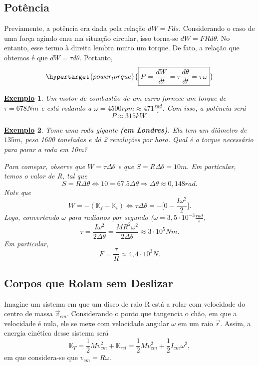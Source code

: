 \documentclass{article}
\newtheorem{example}{\underline{Exemplo}}
\begin{document}
\subsection{Potência}
Previamente, a potência era dada pela relação \(dW = F ds.\) Considerando o caso de uma força agindo
emu ma situação circular, isso torna-se \(dW = FRd\theta \). No entanto, esse termo à direita lembra muito um torque. De fato,
a relação que obtemos é que \(dW = \tau d\theta \). Portanto, 
\[
  \hypertarget{power_torque}{\boxed{P = \frac{dW}{dt} = \tau \frac{d\theta }{dt} = \tau \omega }}
\]
\begin{example}
  Um motor de combustão de um carro fornece um torque de \(\tau  = 678Nm\) e está rodando a \(\omega = 4500rpm \approx 471 \frac{rad}{s}\).
  Com isso, a potência será 
  \[
    P\approx 315kW.
  \]
\end{example}
\begin{example}
  Tome uma roda gigante \textbf{(em Londres).} Ela tem um diâmetro de \(135m\), pesa 1600 toneladas e dá 2 revoluções por hora.
  Qual é o torque necessário para parar a roda em 10m?

  Para começar, observe que \(W = \tau \Delta \theta \) e que \(S = R\Delta \theta = 10m.\) Em particular, temos o valor de R, tal que 
  \[
    S = R\Delta \theta \Longleftrightarrow 10 = 67.5\Delta \theta \Rightarrow \Delta \theta \approx 0,148rad.
  \]
  Note que 
  \[
    W = -(\mathbb{K}_{f} - \mathbb{K}_{i}) \Longleftrightarrow \tau \Delta \theta = -\biggl[0 - \frac{I\omega^{2}}{2}\biggr].
  \]
  Logo, convertendo \(\omega \) para radianos por segundo (\(\omega = 3,5 \cdot 10^{-3}\frac{rad}{s}\),
  \[
    \tau = \frac{I\omega^{2}}{2\Delta \theta } = \frac{MR^{2}\omega^{2}}{2\Delta \theta } \approx 3 \cdot 10^{5}Nm.
  \]
  Em particular, 
  \[
    F = \frac{\tau }{R}\approx 4,4 \cdot 10^{3}N.
  \]
\end{example}
\subsection{Corpos que Rolam sem Deslizar}
Imagine um sistema em que um disco de raio R está a rolar com velocidade do centro de massa \(\vec{v}_{cm}.\) Considerando o ponto que tangencia o chão, em que a velocidade é nula,
ele se mexe com velocidade angular \(\omega \) em um raio \(\vec{r}\). Assim, a energia cinética desse sistema será 
\[
  \mathbb{K}_{T} = \frac{1}{2} Mv_{cm}^{2} + \mathbb{K}_{rel} = \frac{1}{2}Mv_{cm}^{2} + \frac{1}{2}I_{cm}\omega ^{2},
\]
em que considera-se que \(v_{cm} = R\omega.\) 
\end{document}
